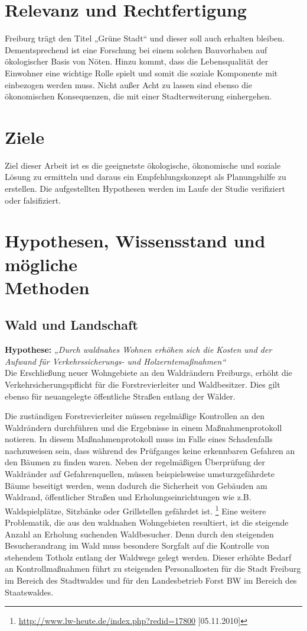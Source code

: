 \documentclass[12pt]{article}
\newcommand{\citefooturldate}[2]{\footnote{\url{#1} [#2]}}
\begin{document}
\section{Relevanz und Rechtfertigung}
Freiburg trägt den Titel „Grüne Stadt“ und dieser soll auch erhalten bleiben. 
Dementsprechend ist eine Forschung bei einem solchen Bauvorhaben auf ökologischer 
Basis von Nöten. Hinzu kommt, dass die Lebensqualität der Einwohner eine wichtige 
Rolle spielt und somit die soziale Komponente mit einbezogen werden muss. Nicht 
außer Acht zu lassen sind ebenso die ökonomischen Konsequenzen, die mit einer 
Stadterweiterung einhergehen.

\section{Ziele}
Ziel dieser Arbeit ist es die geeignetste ökologische, ökonomische und soziale Lösung zu 
ermitteln und daraus ein Empfehlungskonzept als Planungshilfe zu erstellen. 
Die aufgestellten Hypothesen werden im Laufe der Studie verifiziert oder falsifiziert.

\section{Hypothesen, Wissensstand und mögliche \\ Methoden}
\subsection{Wald und Landschaft}

\textbf{Hypothese:}	\textit{„Durch waldnahes Wohnen erhöhen sich die Kosten und der Aufwand für 
                 Verkehrssicherungs- und Holzerntemaßnahmen“} \\

\noindent Die Erschließung neuer Wohngebiete an den Waldrändern Freiburgs, 
erhöht die Verkehrsicherungspflicht für die Forstrevierleiter und Waldbesitzer. 
Dies gilt ebenso für neuangelegte öffentliche Straßen entlang der Wälder.
 
Die zuständigen Forstrevierleiter müssen regelmäßige Kontrollen an den Waldrändern durchführen und 
die Ergebnisse in einem Maßnahmenprotokoll 
notieren. In diesem Maßnahmenprotokoll muss im Falle eines Schadenfalls nachzuweisen sein,
dass während des Prüfganges keine erkennbaren Gefahren an den Bäumen zu finden waren. Neben der 
regelmäßigen Überprüfung der Waldränder auf Gefahrenquellen, müssen beispielsweise umsturzgefährdete 
Bäume beseitigt werden, wenn dadurch die Sicherheit von Gebäuden am Waldrand, öffentlicher 
Straßen und Erholungseinrichtungen wie z.B. Waldspielplätze, Sitzbänke oder Grillstellen gefährdet ist. 
\citefooturldate{http://www.lw-heute.de/index.php?redid=17800}{05.11.2010}
Eine weitere Problematik, die aus den waldnahen Wohngebieten resultiert, ist die steigende Anzahl an 
Erholung suchenden Waldbesucher. Denn durch den steigenden Besucherandrang im Wald muss besondere 
Sorgfalt auf die Kontrolle von stehendem Totholz entlang der Waldwege gelegt werden. 
Dieser erhöhte Bedarf an Kontrollmaßnahmen führt zu steigenden Personalkosten für die Stadt Freiburg 
im Bereich des Stadtwaldes und für den Landesbetrieb Forst BW im Bereich des Staatswaldes.
\end{document}
